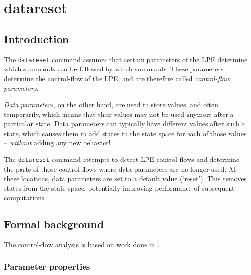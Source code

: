 \chapter{datareset} \label{datareset}

\section{Introduction}

The \texttt{datareset} command assumes that certain parameters of the LPE determine which summands can be followed by which summands.
These parameters determine the control-flow of the LPE, and are therefore called \emph{control-flow parameters}.

\emph{Data parameters}, on the other hand, are used to store values, and often temporarily, which means that their values may not be used anymore after a particular state.
Data parameters can typically have different values after such a state, which causes them to add states to the state space for each of those values -- \emph{without} adding any new behavior!

The \texttt{datareset} command attempts to detect LPE control-flows and determine the parts of those control-flows where data parameters are no longer used.
At these locations, data parameters are set to a default value (`reset').
This removes states from the state space, potentially improving performance of subsequent computations.

\section{Formal background}

The control-flow analysis is based on work done in \cite{van2009state}.

\subsection{Parameter properties}

